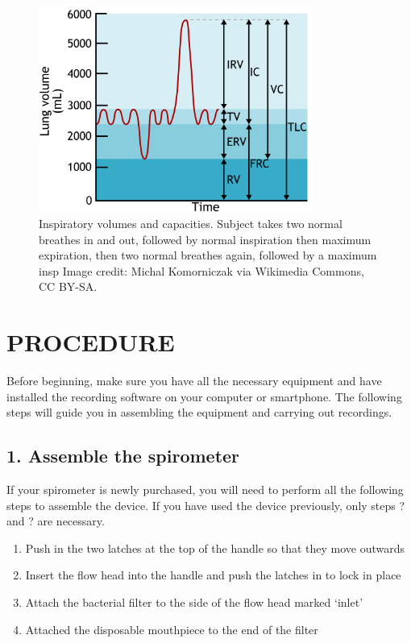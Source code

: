 \documentclass[12pt]{article}
\begin{document}
\begin{figure}[h!]
\centering
\includegraphics[width=0.8\textwidth]{images/volumesCapacities.png}
\caption{Inspiratory volumes and capacities. Subject takes two normal breathes in and out, followed by normal inspiration then maximum expiration, then two normal breathes again, followed by a maximum insp  Image credit: Michal Komorniczak via Wikimedia Commons, CC BY-SA.}
\label{fig:volsCaps}
\end{figure}

\section*{PROCEDURE}

Before beginning, make sure you have all the necessary equipment and have installed the recording software on your computer or smartphone. The following steps will guide you in assembling the equipment and carrying out recordings.

\subsection*{1. Assemble the spirometer}

If your spirometer is newly purchased, you will need to perform all the following steps to assemble the device. If you have used the device previously, only steps ? and ? are necessary.

\vspace{0.2cm}

\begin{enumerate}
\item Push in the two latches at the top of the handle so that they move outwards 
\item Insert the flow head into the handle and push the latches in to lock in place 	
\item Attach the bacterial filter to the side of the flow head marked `inlet'
\item Attached the disposable mouthpiece to the end of the filter
\end{enumerate}
\end{document}
